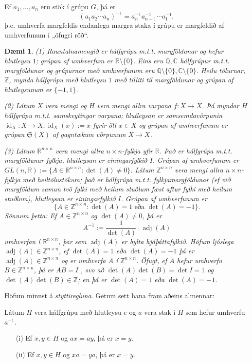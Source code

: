 \documentclass[a4paper,icelandic,11pt]{book}
\theoremstyle{plain}
\newtheorem{daemi}{Dæmi}[chapter]
\newcommand{\R}{\mathbb{R}}
\newcommand{\Z}{\mathbb{Z}}
\newcommand{\Q}{\mathbb{Q}}
\newcommand{\C}{\mathbb{C}}
\DeclareMathOperator{\id}{id} %
\DeclareMathOperator{\adj}{adj} %
\begin{document}
\begin{fylgisetn}
  Ef $a_1, \dots, a_n$ eru stök í grúpu $G$, þá er
  \[ (a_1 a_2 \cdots a_n )^{-1} = a_n^{-1}a_{n-1}^{-1}\cdots a_1^{-1},  \]
  þ.e. umhverfa margfeldis endanlega margra staka í grúpu er margfeldið af
  umhverfunum í „öfugri röð“.
\end{fylgisetn}
\begin{daemi}
  (1) Rauntalnamengið er hálfgrúpa m.t.t. margföldunar og hefur hlutleysu $1$;
  grúpan af umhverfum er $\R\setminus\{ 0 \} $. Eins eru $\Q,\C$ hálfgrúpur
  m.t.t. margföldunar og grúpurnar með umhverfunum eru $\Q\setminus\{0\},
  \C\setminus\{0\}$. Heilu tölurnar, $\Z$, mynda hálfgrúpu með hlutleysu $1$
  með tilliti til margföldunar og grúpan af hlutleysunum er $\{-1,1\}$.

  (2) Látum $X$ vera mengi og $H$ vera mengi allra varpana $f:X\to X$. Þá
  myndar $H$ hálfgrúpu m.t.t. samskeytingar varpana; hlutleysan er
  samsemdavörpunin $\id_X: X\to X; \id_X(x):=x$ fyrir öll $x\in X$ og grúpan
  af umhverfunum er grúpan $\mathfrak S (X)$ af \emph{gagntækum} vörpunum
  $X\to X$.

  (3) Látum $\R^{n\times n}$ vera mengi allra $n\times n$-fylkja yfir $\R$.
  Það er hálfgrúpa m.t.t. margföldunar fylkja, hlutleysan er einingarfylkið
  $I$. Grúpan af umhverfunum er $GL(n,\R) := \{ A\in \R^{n\times n}: \det (A)
  \neq 0 \}$. Látum $\Z^{n\times n}$ vera mengi allra $n\times n$-fylkja með
  heiltölustökum; það er hálfgrúpa m.t.t. fylkjamargföldunar (ef við
  margföldum saman tvö fylki með heilum stuðlum fæst aftur fylki með heilum
  stuðlum), hlutleysan er einingarfylkið $I$. Grúpan af umhverfunum er
  \[ \{ A\in \Z^{n\times n} : \det (A) = 1 \text{ eða } \det(A) = -1 \}. \]
  \emph{Sönnum þetta: } Ef $A\in \Z^{n\times n}$ og $\det (A) \neq 0$, þá er
  \[ A^{-1} := \frac 1 {\det(A)} \cdot \adj (A) \]
  umhverfan í $\R^{n\times n}$, þar sem $\adj(A)$ er bylta hjáþáttafylkið.
  Höfum ljóslega $\adj(A)\in \Z^{n\times n}$, ef $\det(A) = 1$ eða $\det(A) =
  -1$ þá er $\adj(A)\in \Z^{n\times n}$ og er umhverfa $A$ í $\Z^{n\times n}$.
  Öfugt, ef $A$ hefur umhverfu $B\in \Z^{n\times n}$, þá er $AB = I$ , svo að
  $\det(A)\det(B) = \det I = 1$ og $\det(A)\det(B) \in \Z$; en þá er $\det(A)
  = 1$ eða $\det(A) = -1$.
\end{daemi}
Höfum minnst á \emph{styttiregluna}. Getum sett hana fram aðeins almennar:
\begin{setn}
  Látum $H$ vera hálfgrúpu með hlutleysu $e$ og $a$ vera stak í $H$ sem hefur
  umhverfu $a^{-1}$.
  \begin{itemize}
    \item [(i)] Ef $x,y\in H$ og $ax = ay$, þá er $x=y$.
    \item [(ii)] Ef $x,y\in H$ og $xa = ya$, þá er $x=y$.
  \end{itemize}
\end{setn}
\end{document}
